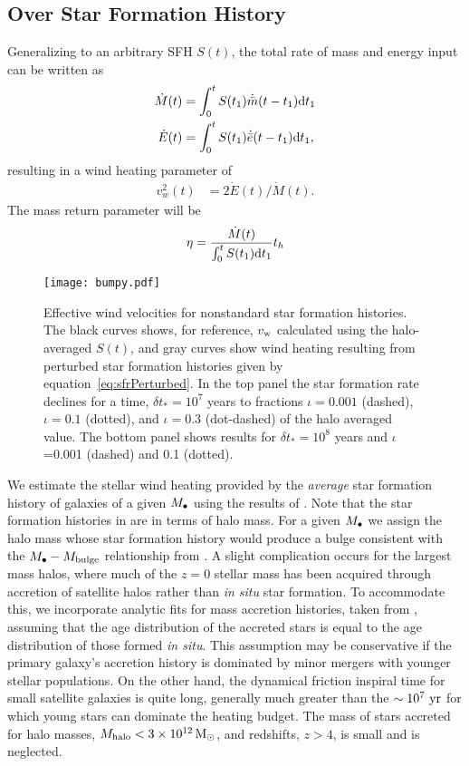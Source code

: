 \subsection{Over Star Formation History}
Generalizing to an arbitrary SFH $S(t)$, the total rate of mass and energy input can be written as
\begin{align} 
  \dot{M}(t) &= \int_0^t S(t_1) \dot{\bar{m}}(t-t_1){\rm
      d}t_1 \label{eq:MDotSFH}\\
  \dot{E}(t) &= \int_0^t S(t_1) \dot{\bar{e}}(t-t_1){\rm
      d}t_1, \label{eq:EDotSFH}
\end{align}
resulting in a wind heating parameter of 
\begin{align}
  v_w^2(t) &=2 \dot{E}(t)/\dot{M}(t).
\end{align}
The mass return parameter will be
\begin{align}
\eta = \frac{\dot{M}(t)}{\int_0^t S(t_1) {\rm d}t_1} t_h
\end{align}

 \begin{figure}
  \texttt{[image: bumpy.pdf]}
  \caption{\label{fig:NickPlot2} Effective wind velocities for
    nonstandard star formation histories.  The black curves shows, for
    reference, $v_{\rm w}$ calculated using the halo-averaged $S(t)$,
    and gray curves show wind heating resulting from perturbed star
    formation histories given by equation~\eqref{eq:sfrPerturbed}. In
    the top panel the star formation rate declines for a time, $\delta
    t_*=10^{7}$ years to fractions $\iota= 0.001$ (dashed), $\iota
    =0.1$ (dotted), and $\iota = 0.3$ (dot-dashed) of the halo
    averaged value. The bottom panel shows results for $\delta
    t_*=10^{8}$ years and $\iota$=0.001 (dashed) and 0.1 (dotted).}
  \end{figure}
  We estimate the stellar wind heating provided by the {\it average}
  star formation history of galaxies of a given $M_{\bullet}$ using the
  results of \citet[eqs.~17-20]{MosterNaab+:2013a}.  Note that the
  star formation histories in \citet{MosterNaab+:2013a} are in terms
  of halo mass. For a given $M_{\bullet}$ we assign the halo mass whose star
  formation history would produce a bulge consistent with the
  $M_{\bullet}-M_{\rm bulge}$ relationship from \citet{McConnellMa:2013a}.  A
  slight complication occurs for the largest mass halos, where much of
  the $z=0$ stellar mass has been acquired through accretion of
  satellite halos rather than {\it in situ} star formation.  To
  accommodate this, we incorporate analytic fits for mass accretion
  histories, taken from \citet[their eqs.~21-23]{MosterNaab+:2013a},
  assuming that the age distribution of the accreted stars is equal to
  the age distribution of those formed {\it in situ}.  This assumption
  may be conservative if the primary galaxy's accretion history is
  dominated by minor mergers with younger stellar populations.  On the
  other hand, the dynamical friction inspiral time for small satellite
  galaxies is quite long, generally much greater than the $\sim
  10^7~{\rm yr}$ for which young stars can dominate the heating
  budget.  The mass of stars accreted for halo masses, $M_{\rm halo}< 3
  \times 10^{12} \,{\rm M_\odot}$, and redshifts, $z>4$, is small and is neglected.

